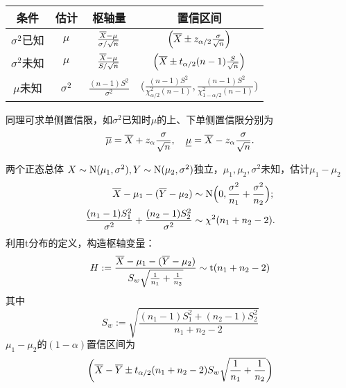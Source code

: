 \begin{center}
	\begin{tabular}{cccc}
		\toprule
		条件&估计&枢轴量&置信区间\\
		\midrule
		$\sigma^2$已知&$\mu$&$\frac{\overline X-\mu}{\sigma/\sqrt n}$&$\left(\overline X\pm z_{\alpha/2}\frac\sigma{\sqrt n}\right)$\\[2ex]
		$\sigma^2$未知&$\mu$&$\frac{\overline X-\mu}{S/\sqrt n}$&$\left(\overline X\pm t_{\alpha/2}(n-1)\frac S{\sqrt n}\right)$\\[2ex]
		$\mu$未知&$\sigma^2$&$\frac{(n-1)S^2}{\sigma^2}$&$\biggl(\frac{(n-1)S^2}{\chi_{\alpha/2}^2(n-1)},\frac{(n-1)S^2}{\chi_{1-\alpha/2}^2(n-1)}\biggr)$\\
		\bottomrule
	\end{tabular}
\end{center}
同理可求单侧置信限，如$\sigma^2$已知时$\mu$的上、下单侧置信限分别为
\[
	\overline\mu=\overline X+z_\alpha\frac\sigma{\sqrt n},\quad\underline\mu=\overline X-z_\alpha\frac\sigma{\sqrt n}.
\]
\begin{example}{两个正态总体}{}
	$X\sim\operatorname{N}(\mu_1,\sigma^2),Y\sim\operatorname{N}(\mu_2,\sigma^2)$独立，$\mu_1,\mu_2,\sigma^2$未知，估计$\mu_1-\mu_2$
	\begin{align*}
		\overline X-\mu_1-(\overline Y-\mu_2)&\sim\operatorname{N}\Bigl(0,\frac{\sigma^2}{n_1}+\frac{\sigma^2}{n_2}\Bigr);\\
		\frac{(n_1-1)S_1^2}{\sigma^2}+\frac{(n_2-1)S_2^2}{\sigma^2}&\sim\chi^2(n_1+n_2-2).
	\end{align*}
	利用t分布的定义，构造枢轴变量：
	\[
		H:=\frac{\overline X-\mu_1-(\overline Y-\mu_2)}{S_w\sqrt{\frac1{n_1}+\frac1{n_2}}}\sim\mathrm t(n_1+n_2-2)
	\]
	其中 
	\[
		S_w:=\sqrt{\frac{(n_1-1)S_1^2+(n_2-1)S_2^2}{n_1+n_2-2}}
	\]
	$\mu_1-\mu_2$的$(1-\alpha)$置信区间为
	\[
		\left(\overline X-\overline Y\pm t_{\alpha/2}(n_1+n_2-2)S_w\sqrt{\frac1{n_1}+\frac1{n_2}}\right)
	\]
\end{example}
